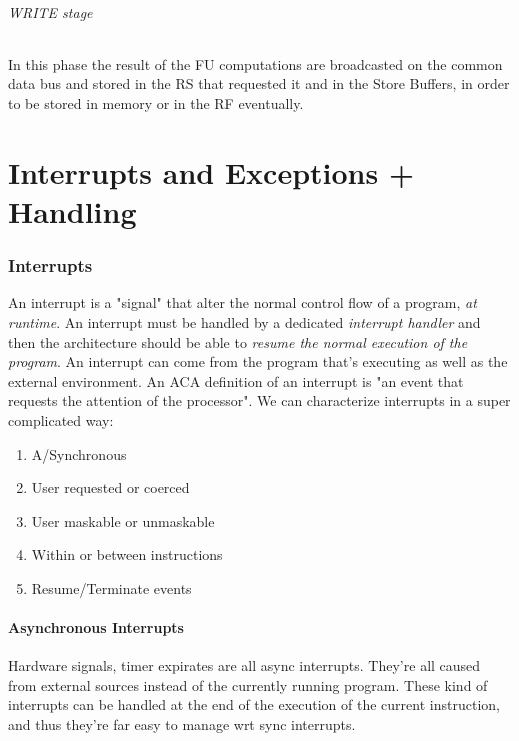 \documentclass[10pt,a4paper]{article}
\begin{document}
					\paragraph{WRITE stage}
						In this phase the result of the FU computations are broadcasted on the common data bus and stored in the RS that requested it and in the Store Buffers, in order to be stored in memory or in the RF eventually.
						
	\part{Interrupts and Exceptions + Handling}
		\section{Interrupts}
			An interrupt is a "signal" that alter the normal control flow of a program, \emph{at runtime}. An interrupt must be handled by a dedicated \emph{interrupt handler} and then the architecture should be able to \emph{resume the normal execution of the program}. An interrupt can come from the program that's executing as well as the external environment. An ACA definition of an interrupt is "an event that requests the attention of the processor". We can characterize interrupts in a super complicated way:
			\begin{enumerate}
				\item A/Synchronous
				\item User requested or coerced
				\item User maskable or unmaskable
				\item Within or between instructions
				\item Resume/Terminate events
			\end{enumerate}
			
			\subsection{Asynchronous Interrupts}
				Hardware signals, timer expirates are all async interrupts. They're all caused from external sources instead of the currently running program. These kind of interrupts can be handled at the end of the execution of the current instruction, and thus they're far easy to manage wrt sync interrupts.
				
\end{document}
